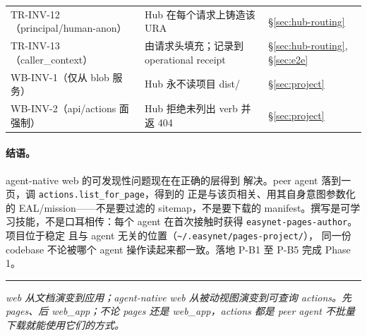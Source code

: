 \documentclass[11pt,a4paper]{article}
\theoremstyle{definition}
\begin{document}
\begin{center}
\begin{tabularx}{\linewidth}{l X l}
TR-INV-12（principal/human-anon）        & Hub 在每个请求上铸造该 URA                                & \S\ref{sec:hub-routing} \\
TR-INV-13（caller\_context）             & 由请求头填充；记录到 operational receipt                  & \S\ref{sec:hub-routing}, \S\ref{sec:e2e} \\
WB-INV-1（仅从 blob 服务）              & Hub 永不读项目 dist/                                      & \S\ref{sec:project} \\
WB-INV-2（api/actions 面强制）          & Hub 拒绝未列出 verb 并返 404                              & \S\ref{sec:project} \\
\bottomrule
\end{tabularx}
\end{center}

\paragraph{结语。} agent-native web 的可发现性问题现在在正确的层得到
解决。peer agent 落到一页，调 \texttt{actions.list\_for\_page}，得到的
正是与该页相关、用其自身意图参数化的 EAL/mission——不是要过滤的
sitemap，不是要下载的 manifest。撰写是可学习技能，不是口耳相传：每个
agent 在首次接触时获得 \texttt{easynet-pages-author}。项目位于稳定
且与 agent 无关的位置（\texttt{\textasciitilde/.easynet/pages-project/}），
同一份 codebase 不论被哪个 agent 操作读起来都一致。落地 P-B1 至 P-B5
完成 Phase 1。

\vfill
\hrule
\vspace{0.4em}
\noindent\small
\textit{web 从文档演变到应用；agent-native web 从被动视图演变到可查询
actions。先 pages、后 web\_app；不论 pages 还是 web\_app，actions 都是
peer agent 不批量下载就能使用它们的方式。}
\end{document}
